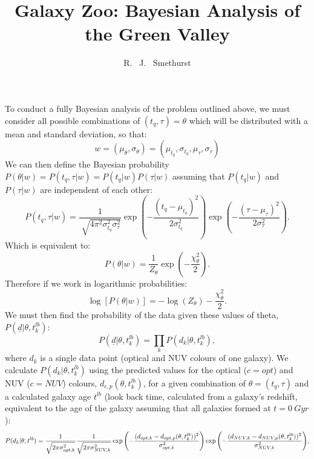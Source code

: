 \documentclass{article}[11pt]
\begin{document}
\title{Galaxy Zoo: Bayesian Analysis of the Green Valley}
\author{R. ~J. ~Smethurst}

\maketitle
To conduct a fully Bayesian analysis of the problem outlined above, we must consider all possible combinations of $(t_{q}, \tau) = \theta$ which will be distributed with a mean and standard deviation, so that:
\begin{equation*}
w = (\mu_{\theta}, \sigma_{\theta}) = (\mu_{t_{q}}, \sigma_{t_{q}}, \mu_{\tau}, \sigma_{\tau})
\end{equation*}
We can then define the Bayesian probability $P(\theta|w) = P(t_{q}, \tau|w) = P(t_{q}|w)P(\tau|w)$ assuming that $ P(t_{q}|w)$ and $P(\tau|w)$ are independent of each other:
\begin{equation*}
P(t_{q}, \tau|w) = \frac{1}{\sqrt[]{4\pi^2\sigma^2_{t_{q}}\sigma^2_{\tau}}} \exp\left(-\frac{(t_{q}-\mu_{t_{q}})^2}{2\sigma^2_{t_{q}}}\right)\exp\left(-\frac{(\tau-\mu_{\tau})^2}{2\sigma^2_{\tau}}\right).
\end{equation*}
Which is equivalent to:
\begin{equation*}
P(\theta|w) = \frac{1}{Z_{\theta}} \exp\left(-\frac{\chi_{\theta}^2}{2}\right).
\end{equation*}
Therefore if we work in logarithmic probabilities:
\begin{equation*}
\log[P(\theta|w)] = - \log(Z_{\theta}) - \frac{\chi_{\theta}^2}{2}.
\end{equation*}
We must then find the probability of the data given these values of theta, $P(\underline{d}|\theta, t_{k}^{lb})$:
\begin{equation*}
P(\underline{d}|\theta, t_{k}^{lb}) = \prod_{k} P(d_{k}|\theta, t_{k}^{lb}),
\end{equation*}
where $d_{k}$ is a single data point (optical and NUV colours of one galaxy). We calculate $P(d_{k}|\theta, t_{k}^{lb})$ using the predicted values for the optical ($c=opt$) and NUV ($c=NUV$) colours, $d_{c,p}(\theta, t_{k}^{lb})$, for a given combination of $\theta = (t_{q}, \tau)$ and a calculated galaxy age $t^{lb}$ (look back time, calculated from a galaxy's redshift, equivalent to the age of the galaxy assuming that all galaxies formed at $t=0~Gyr$):
\begin{equation*}
P(d_{k}|\theta, t^{lb}) = \frac{1}{\sqrt{2\pi\sigma_{opt, k}^2}}\frac{1}{\sqrt{2\pi\sigma_{NUV, k}^2}} \\  \exp{\left( - \frac{(d_{opt, k} - d_{opt, p}(\theta, t_{k}^{lb}))^2}{\sigma_{opt, k}^2} \right)} \\ \exp{\left( - \frac{(d_{NUV, k} - d_{NUV, p}(\theta, t_{k}^{lb}))^2}{\sigma_{NUV, k}^2} \right)},
\end{equation*}
\end{document}
